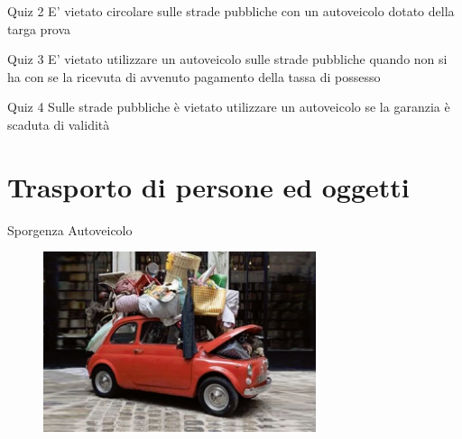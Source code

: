     
    
    
    
    
\begin{frame}{Quiz 2}
	E' vietato circolare sulle strade pubbliche con un autoveicolo dotato della targa prova
     
	\quizF
         
\end{frame}
    
    
    
    
    
    
\begin{frame}{Quiz 3}
	E' vietato utilizzare un autoveicolo sulle strade pubbliche quando non si ha con se la ricevuta di
	avvenuto pagamento della tassa di possesso
     
	\quizF
         
\end{frame}  
    
    
    
    
    
    
\begin{frame}{Quiz 4}
	 Sulle strade pubbliche \`e vietato utilizzare un autoveicolo se la garanzia \`e scaduta di validit\`a
     
	\quizF
         
\end{frame}      

  
    



  
\section{Trasporto di persone ed oggetti}



\begin{frame}{Sporgenza Autoveicolo}
\begin{figure}[ht!]
    		\centering
         		\includegraphics[width = 8cm]{images/esempio_sporg.png}
    	\end{figure}
\end{frame} 






